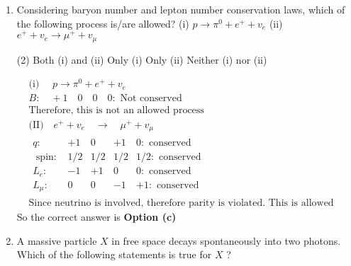 \begin{enumerate}
		{}
	\begin{figure}[H]
		\centering
		\texttt{[image: NP-13]}
	\end{figure}
	 \begin{tasks}(4)
		\task[\textbf{a.}]$P$
		\task[\textbf{b.}]$Q$
		\task[\textbf{c.}]$R$
		\task[\textbf{d.}] $S$ 
	\end{tasks}
\begin{answer}$\left. \right. $
	\begin{figure}[H]
		\centering
		\texttt{[image: NP-17]}
	\end{figure}
		So the correct answer is \textbf{Option (c)}
\end{answer}
	\item  Considering baryon number and lepton number conservation laws, which of the following process is/are allowed?
	(i) $p \rightarrow \pi^0+e^{+}+v_e$\hspace{2cm}
	(ii) $e^{+}+v_e \rightarrow \mu^{+}+v_\mu$
	{}
	 \begin{tasks}(2)
		\task[\textbf{a.}]Both (i) and (ii)
		\task[\textbf{b.}]Only (i)
		\task[\textbf{c.}]Only (ii)
		\task[\textbf{d.}]Neither (i) nor (ii)
	\end{tasks}
\begin{answer}
	\begin{align*}
	 &\text{(i) }\quad p \rightarrow \pi^0+e^{+}+v_e\\
	&B: \quad+1 \quad 0 \quad 0 \quad 0:\text{ Not conserved}\\ 
	&\text{Therefore, this is not an allowed process}\\
	&\text{(II)}\quad e^{+}+v_e \quad \rightarrow \quad \mu^{+}+v_\mu\\
	&\begin{array}{lclcc}
	q: & +1 & 0 & +1 & 0: \text { conserved } \\
	\text { spin: } & 1 / 2 & 1 / 2 & 1 / 2 & 1 / 2: \text { conserved } \\
	L_e: & -1 & +1 & 0 & 0: \text { conserved } \\
	L_\mu: & 0 & 0 & -1 & +1: \text { conserved }
	\end{array}\\
	&\text{Since neutrino is involved, therefore parity is violated. This is allowed through weak interaction.}
	\end{align*}
		So the correct answer is \textbf{Option (c)}
\end{answer}
	\item  A massive particle $X$ in free space decays spontaneously into two photons. Which of the following statements is true for $X$ ?

\end{enumerate}
